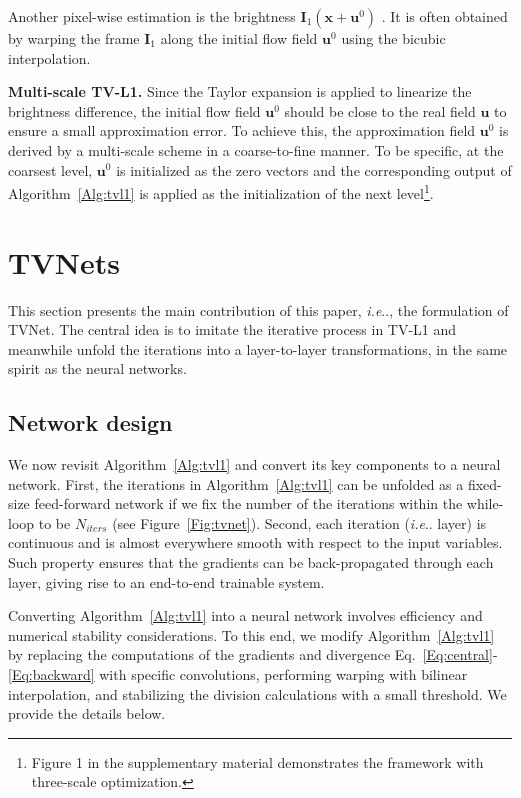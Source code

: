 \documentclass[10pt,twocolumn,letterpaper]{article}
\makeatletter
\DeclareRobustCommand\onedot{\futurelet\@let@token\@onedot}
\def\@onedot{\ifx\@let@token.\else.\null\fi\xspace}
\def\ie{\emph{i.e}\onedot} \def\Ie{\emph{I.e}\onedot}
\def\Vec#1{{\boldsymbol{#1}}}
\def\Mat#1{{\boldsymbol{#1}}}
\makeatother
\begin{document}
Another pixel-wise estimation is the brightness $\Mat{I}_1(\Vec{x}+\Vec{u}^0)$ . It is often obtained  by warping the frame $\Mat{I}_1$ along the initial flow field $\Vec{u}^0$ using the bicubic interpolation.


\textbf{Multi-scale TV-L1.} Since the Taylor expansion is applied to linearize the brightness difference, the initial flow field $\Vec{u}^0$ should be close to the real field $\Vec{u}$ to ensure a small approximation error. To achieve this, the approximation field $\Vec{u}^0$ is derived by a multi-scale scheme in a coarse-to-fine manner. To be specific, at the coarsest level, $\Vec{u}^0$ is initialized as the zero vectors and the corresponding output of Algorithm~\ref{Alg:tvl1} is applied as the initialization of the next level\footnote{Figure 1 in the supplementary material demonstrates the framework with three-scale optimization.}.


 \section{TVNets}
\label{Sec:tvnet}
This section presents the main contribution of this paper, \ie, the formulation of TVNet.
The central idea is to imitate the  iterative process in TV-L1 and meanwhile unfold the iterations into a layer-to-layer transformations, in the same spirit as the neural networks.

\subsection{Network design}
\label{Sec:network}
We now revisit Algorithm~\ref{Alg:tvl1} and convert its key components to a neural network.
First, the iterations in Algorithm~\ref{Alg:tvl1} can be unfolded as a fixed-size feed-forward network if we fix the number of the iterations within the while-loop to be $N_{iters}$ (see Figure~\ref{Fig:tvnet}).
Second, each iteration (\ie layer) is continuous and is almost everywhere smooth with respect to the input variables. Such property ensures that the gradients can be back-propagated through each layer, giving rise to an end-to-end trainable system.


Converting Algorithm~\ref{Alg:tvl1} into a neural network involves efficiency and numerical stability considerations. To this end, we modify Algorithm~\ref{Alg:tvl1} by replacing the computations of the gradients and divergence Eq.~\eqref{Eq:central}-\eqref{Eq:backward} with specific convolutions, performing warping with bilinear interpolation, and stabilizing the division calculations with a small threshold.  We provide the details below.
\end{document}
